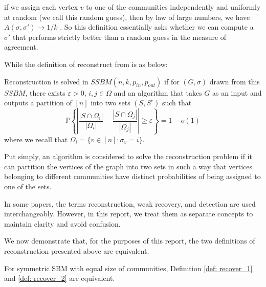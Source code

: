 \begin{remark}
    if we assign each vertex $v$ to one of the communities independently and uniformly at random (we call this random guess), then by law of large numbers, we have $A(\sigma, \sigma')\rightarrow 1/k$ \cite{TheSurvey}. So this definition essentially asks whether we can compute a $\sigma'$ that performs strictly better than a random guess in the measure of agreement.
\end{remark}
While the definition of reconstruct from \cite{TheConjecture} is as below:
\begin{definition}[Reconstruction]\label{def: recover_2}
Reconstruction is solved in $SSBM(n, k, p_{in}, p_{out})$ if for $(G,\sigma)$ drawn from this $SSBM$, there exists $\varepsilon > 0$, $i,j \in\Omega$ and an algorithm that takes $G$ as an input and outputs a partition of $[n]$ into two sets $(S,S^c)$ such that\begin{equation}\label{equn:1.4}
    \mathbb{P}\left\{ \left| \frac{|S \cap \Omega_i|}{|\Omega_i|} - \frac{|S \cap \Omega_j|}{|\Omega_j|} \right| \geq \varepsilon \right\} = 1 - o(1)
\end{equation}
where we recall that $\Omega_i = \{ v\in [n] : \sigma_v = i \}.$
\end{definition}
\begin{remark}
    Put simply, an algorithm is considered to solve the reconstruction problem if it can partition the vertices of the graph into two sets in such a way that vertices belonging to different communities have distinct probabilities of being assigned to one of the sets. 
\end{remark}
\begin{remark}
    In some papers, the terms reconstruction, weak recovery, and detection are used interchangeably. However, in this report, we treat them as separate concepts to maintain clarity and avoid confusion.
\end{remark}
We now demonstrate that, for the purposes of this report, the two definitions of reconstruction presented above are equivalent.
\begin{claim}\label{claim1}
    For symmetric SBM with equal size of communities, Definition \ref{def: recover_1} and \ref{def: recover_2} are equivalent.
\end{claim}
